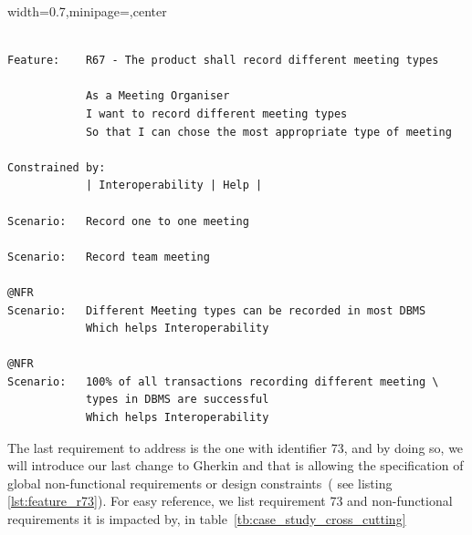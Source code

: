 \documentclass[dissertation,final]{softeng}
\newcommand{\nfrs}{non-functional requirements\xspace}
\newenvironment{featurecode}[1]
{ \lrbox\featurebox \begin{adjustbox}{width=#1\textwidth,minipage=\textwidth,center} }
{ \end{adjustbox}\endlrbox}
\newenvironment{featurelist}[2]
{
\newcommand{\setcaption}{\caption{#1}}
\newcommand{\setlabel}{\label{#2}}
}
{\begin{listing}[h!]\centering\usebox\featurebox\setcaption\setlabel\end{listing}}
\begin{document}
\begin{featurelist}{R67 -- The product shall record different meeting types}{lst:feature_r67}
\begin{featurecode}{0.7}
\begin{verbatim}

Feature:    R67 - The product shall record different meeting types

            As a Meeting Organiser
            I want to record different meeting types
            So that I can chose the most appropriate type of meeting
	
Constrained by:
            | Interoperability | Help |

Scenario:   Record one to one meeting

Scenario:   Record team meeting
	
@NFR	
Scenario:   Different Meeting types can be recorded in most DBMS
            Which helps Interoperability

@NFR
Scenario:   100% of all transactions recording different meeting \
            types in DBMS are successful
            Which helps Interoperability
\end{verbatim}
\end{featurecode}
\end{featurelist}

The last requirement to address is the one with identifier 73, and by doing so, we will introduce our last change to Gherkin and that is allowing the specification of global \nfrs or design constraints~( see listing \ref{lst:feature_r73}). For easy reference, we list requirement 73 and \nfrs it is impacted by, in table~\ref{tb:case_study_cross_cutting}

\begin{table}[h!]
\caption[Cross-cutting \nfrs]{Cross-cutting \nfrs}
\label{tb:case_study_cross_cutting}
\setlength{\extrarowheight}{1.8pt}
\centering
{}
\end{table}
\end{document}
